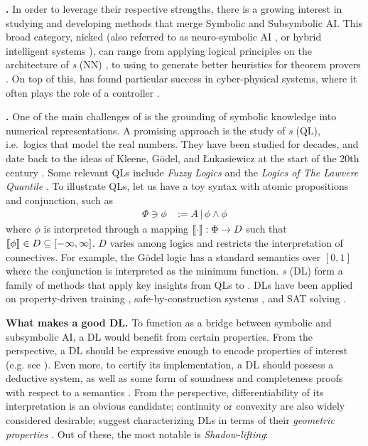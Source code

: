 \textbf{\InAI{}.} In order to leverage their respective strengths, there is a growing interest in studying and developing methods that merge Symbolic and Subsymbolic AI. This broad category, nicked \emph{\InAI{}}  \citep{Platzer_2024} (also referred to as neuro-symbolic AI \citep{d2009neural}, or hybrid intelligent systems \citep{medsker2012hybrid}), can range from applying logical principles on the architecture of \emph{ \NN{}s} (NN)  \citep{badreddine2022logic, petersen2022deep}, to using \SuAI{} to generate better heuristics for theorem provers \citep{laurent2022learning}. On top of this, \InAI{} has found particular success in cyber-physical systems, where it often plays the role of a controller \citep{Platzer_2024}.

\textbf{\DL{}.} One of the main challenges of \InAI{} is the grounding of symbolic knowledge into numerical representations. A promising approach is the study of \emph{\QL{}s} (QL), i.e.~logics that model the real numbers. They have been studied for decades, and date back to the ideas of Kleene, G\"{o}del, and Łukasiewicz at the start of the 20th century \citep{cintula2011handbook, prooffuzzy}. Some relevant QLs include \emph{Fuzzy Logics} \citep{cintula2011handbook} and the \emph{Logics of The Lawvere Quantile} \citep{bacci2024polynomial, bacci2023propositional, capucci2024quantifiers, bacci2025induction}. To illustrate QLs, let us have a toy syntax with atomic propositions and conjunction, such as
\begin{equation}
\begin{split}
    \Phi \ni \phi &:= A \,|\, \phi \land \phi
\end{split}
\end{equation}
where $\phi$ is interpreted through a mapping $\llbracket \cdot \rrbracket : \Phi \rightarrow D$ such that $ \llbracket \phi \rrbracket \in D \subseteq [-\infty,\infty]$. $D$ varies among logics and restricts the interpretation of connectives. For example, the
G\"{o}del logic \citep{BAAZ200723} has a standard semantics over $[0, 1]$ where the conjunction is interpreted as the minimum function. \emph{\DL{}s} (DL) form a family of methods that apply key insights from QLs to \InAI{}. DLs have been applied on property-driven training \citep{FLINKOW2025103280}, safe-by-construction systems \citep{badreddine2022logic}, and SAT solving \citep{kyrillidis2021continuous, gaglione2022maxsat}. 

\textbf{What makes a good DL.} To function as a bridge between symbolic and subsymbolic AI, a DL would benefit from certain properties. From the \SiAI{} perspective, a DL should be expressive enough to encode properties of interest (e.g. see \citep{vehicle}). Even more, to certify its implementation, a DL should possess a deductive system, as well as some form of soundness and completeness proofs with respect to a semantics \citep{floyd1993assigning, goguen1977initial}. From the \SuAI{} perspective, differentiability of its interpretation is an obvious candidate; continuity or convexity are also widely considered desirable; \citeauthor{varnai2020robustness} suggest characterizing DLs in terms of their \textit{geometric properties} \citep{varnai2020robustness}. Out of these, the most notable is \emph{Shadow-lifting}:

